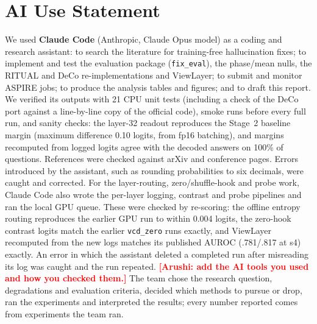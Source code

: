 \documentclass[10pt,a4paper]{article}
\newcommand{\todo}[1]{\textcolor{red}{\textbf{[#1]}}}       %
\newcommand{\code}[1]{\texttt{\small #1}}
\newcommand{\ours}{ViewLayer}
\begin{document}
\section*{AI Use Statement}
We used \textbf{Claude Code} (Anthropic, Claude Opus model) as a coding and research assistant: to search the literature for training-free hallucination fixes; to implement and test the evaluation package (\code{fix\_eval}), the phase/mean nulls, the RITUAL and DeCo re-implementations and \ours{}; to submit and monitor ASPIRE jobs; to produce the analysis tables and figures; and to draft this report. We verified its outputs with 21 CPU unit tests (including a check of the DeCo port against a line-by-line copy of the official code), smoke runs before every full run, and sanity checks: the layer-32 readout reproduces the Stage~2 baseline margin (maximum difference 0.10 logits, from fp16 batching), and margins recomputed from logged logits agree with the decoded answers on 100\% of questions. References were checked against arXiv and conference pages. Errors introduced by the assistant, such as rounding probabilities to six decimals, were caught and corrected. For the layer-routing, zero/shuffle-hook and probe work, Claude Code also wrote the per-layer logging, contrast and probe pipelines and ran the local GPU queue. These were checked by re-scoring: the offline entropy routing reproduces the earlier GPU run to within 0.004 logits, the zero-hook contrast logits match the earlier \code{vcd\_zero} runs exactly, and \ours{} recomputed from the new logs matches its published AUROC (.781/.817 at s4) exactly. An error in which the assistant deleted a completed run after misreading its log was caught and the run repeated. \todo{Arushi: add the AI tools you used and how you checked them.} The team chose the research question, degradations and evaluation criteria, decided which methods to pursue or drop, ran the experiments and interpreted the results; every number reported comes from experiments the team ran.

{\small
\setlength{\bibsep}{2pt plus 1pt}
\renewcommand{\bibsection}{\section*{References}\addcontentsline{toc}{section}{References}}


}

\clearpage
\appendix
{}
\end{document}
